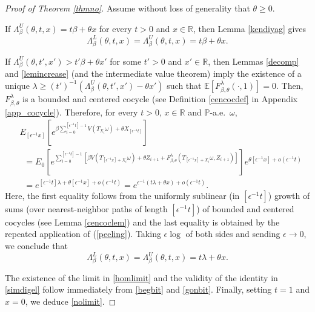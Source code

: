 \documentclass[a4paper]{amsart}
\numberwithin{equation}{section}
\theoremstyle{plain}
\theoremstyle{remark}
\begin{document}
\begin{proof}[Proof of Theorem \ref{thmno}]
Assume without loss of generality that $\theta\ge0$.

If $\Lambda_\beta^U(\theta,t,x) = t\beta + \theta x$ for every $t>0$ and $x\in\mathbb{R}$, then Lemma \ref{kendiyag} gives
\begin{equation}\label{begbit}
\Lambda_\beta^L(\theta,t,x) = \Lambda_\beta^U(\theta,t,x) = t\beta + \theta x.
\end{equation}

If $\Lambda_\beta^U(\theta,t',x') > t'\beta + \theta x'$ for some $t'>0$ and $x'\in\mathbb{R}$, then 
Lemmas \ref{decomp} and \ref{lemincrease} (and the intermediate value theorem) imply the existence of a unique $\lambda \ge (t')^{-1}\left(\Lambda_\beta^U(\theta,t',x') - \theta x'\right)$ such that $\mathbb{E}[F_{\beta,\theta}^\lambda(\cdot,1)] = 0$. Then, $F_{\beta,\theta}^\lambda$ is a bounded and centered cocycle (see Definition \ref{cencocdef} in Appendix \ref{app_cocycle}).
Therefore, for every $t>0$, $x\in\mathbb{R}$ and $\mathbb{P}$-a.e.\ $\omega$,
\begin{align*}
&E_{[{\epsilon^{-1}} x]}\left[e^{\beta\sum_{i=0}^{[{\epsilon^{-1}} t]-1}V(T_{X_i}\omega) + \theta X_{[{\epsilon^{-1}} t]}}\right]\\
&\ \;  = E_0\left[e^{\sum_{i=0}^{[{\epsilon^{-1}} t]-1}[\beta V(T_{[{\epsilon^{-1}} x] + X_i}\omega) + \theta Z_{i+1} + F_{\beta,\theta}^\lambda(T_{[{\epsilon^{-1}} x] + X_i}\omega,Z_{i+1})]}\right]e^{\theta[{\epsilon^{-1}} x] + o({\epsilon^{-1}} t)}\\
&\ \; = e^{[{\epsilon^{-1}} t]\lambda + \theta[{\epsilon^{-1}} x] + o({\epsilon^{-1}} t)} = e^{{\epsilon^{-1}}(t\lambda + \theta x) + o({\epsilon^{-1}} t)}.
\end{align*}
Here, the first equality follows from the uniformly sublinear (in $[{\epsilon^{-1}} t]$) growth of sums (over nearest-neighbor paths of length $[{\epsilon^{-1}} t]$) of bounded and centered cocycles (see Lemma \ref{cencoclem}) and the last equality is obtained by the repeated application of (\ref{peeling}). Taking ${\epsilon}\log$ of both sides and sending ${\epsilon}\to0$, we conclude that \begin{equation}\label{gonbit}
\Lambda_\beta^L(\theta,t,x) = \Lambda_\beta^U(\theta,t,x) = t\lambda + \theta x.
\end{equation}

The existence of the limit in \eqref{homlimit} and the validity of the identity in \eqref{simdigel} follow immediately from \eqref{begbit} and \eqref{gonbit}. Finally, setting $t=1$ and $x=0$, we deduce \eqref{nolimit}.
\end{proof}
\end{document}
